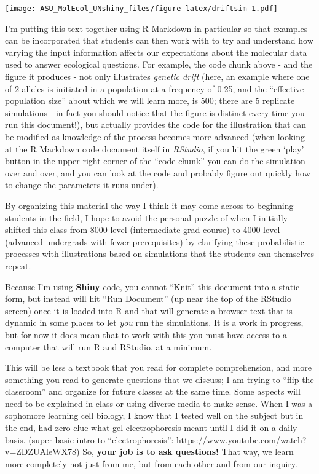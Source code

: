 \documentclass[
]{article}
\begin{document}
\texttt{[image: ASU\_MolEcol\_UNshiny\_files/figure-latex/driftsim-1.pdf]}

I'm putting this text together using R Markdown in particular so that
examples can be incorporated that students can then work with to try and
understand how varying the input information affects our expectations
about the molecular data used to answer ecological questions. For
example, the code chunk above - and the figure it produces - not only
illustrates \emph{genetic drift} (here, an example where one of 2
alleles is initiated in a population at a frequency of 0.25, and the
``effective population size'' about which we will learn more, is 500;
there are 5 replicate simulations - in fact you should notice that the
figure is distinct every time you run this document!), but actually
provides the code for the illustration that can be modified as knowledge
of the process becomes more advanced (when looking at the R Markdown
code document itself in \emph{RStudio}, if you hit the green `play'
button in the upper right corner of the ``code chunk'' you can do the
simulation over and over, and you can look at the code and probably
figure out quickly how to change the parameters it runs under).

By organizing this material the way I think it may come across to
beginning students in the field, I hope to avoid the personal puzzle of
when I initially shifted this class from 8000-level (intermediate grad
course) to 4000-level (advanced undergrads with fewer prerequisites) by
clarifying these probabilistic processes with illustrations based on
simulations that the students can themselves repeat.

Because I'm using \textbf{Shiny} code, you cannot ``Knit'' this document
into a static form, but instead will hit ``Run Document'' (up near the
top of the RStudio screen) once it is loaded into R and that will
generate a browser text that is dynamic in some places to let \emph{you}
run the simulations. It is a work in progress, but for now it does mean
that to work with this you must have access to a computer that will run
R and RStudio, at a minimum.

This will be less a textbook that you read for complete comprehension,
and more something you read to generate questions that we discuss; I am
trying to ``flip the classroom'' and organize for future classes at the
same time. Some aspects will need to be explained in class or using
diverse media to make sense. When I was a sophomore learning cell
biology, I know that I tested well on the subject but in the end, had
zero clue what gel electrophoresis meant until I did it on a daily
basis. (super basic intro to ``electrophoresis'':
\url{https://www.youtube.com/watch?v=ZDZUAleWX78}) So, \textbf{your job
is to ask questions!} That way, we learn more completely not just from
me, but from each other and from our inquiry.
\end{document}
